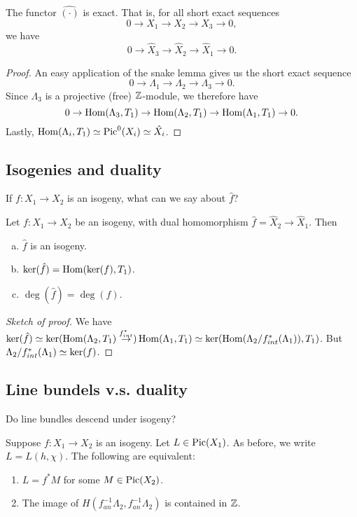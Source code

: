 \begin{lemma}
The functor $\hat{(\cdot)}$ is exact. That is, for all short exact sequences 
$$0\to X_1 \to X_2 \to X_3 \to 0,$$
we have 
$$0\to \hat{X}_3\to \hat{X}_2 \to \hat{X}_1\to 0.$$

\end{lemma} 

\begin{proof}
An easy application of the snake lemma gives us the short exact sequence
$$0\to \Lambda_1\to \Lambda_2\to \Lambda_3\to 0.$$
Since $\Lambda_3$ is a projective (free) ${\mathbb Z}$-module, we therefore have 
$$0\to \operatorname{Hom}(\Lambda_3,T_1)\to \operatorname{Hom}(\Lambda_2,T_1)\to \operatorname{Hom}(\Lambda_1,T_1)\to 0.$$
Lastly, $\operatorname{Hom}(\Lambda_i,T_1)\simeq \operatorname{Pic}^0(X_i)\simeq \hat{X_i}$.
\end{proof}


\subsection{Isogenies and duality}

If $f:X_1\to X_2$ is an isogeny, what can we say about $\hat{f}$?

\begin{proposition}
Let $f:X_1\to X_2$ be an isogeny, with dual homomorphism $\hat{f}=\hat{X}_2\to \hat{X}_1$. Then 
\begin{enumerate}[(a)]
\item $\hat{f}$ is an isogeny.
\item $\ker(\hat{f})=\operatorname{Hom}(\ker(f),T_1)$.
\item $\deg(\hat{f})=\deg(f)$.
\end{enumerate}
\end{proposition}

\begin{proof}[Sketch of proof]
We have $\ker(\hat{f})\simeq \ker(\operatorname{Hom}(\Lambda_2,T_1)\overset{f_{int}^*}{\to}) \operatorname{Hom}(\Lambda_1,T_1)\simeq \ker(\operatorname{Hom}(\Lambda_2/ f_{int}^*(\Lambda_1)),T_1)$. But $\Lambda_2/f_{int}^*(\Lambda_1)\simeq \ker(f)$.
\end{proof}

\subsection{Line bundels v.s. duality}

Do line bundles descend under isogeny? 

\begin{proposition}
Suppose $f:X_1\to X_2$ is an isogeny. Let $L\in \operatorname{Pic}(X_1)$. As before, we write $L=L(h,\chi)$. The following are equivalent:
\begin{enumerate}
\item $L=f^* M$ for some $M\in \operatorname{Pic}(X_2)$.
\item The image of $H(f_{an}^{-1}\Lambda_2, f_{an}^{-1} \Lambda_2)$ is contained in ${\mathbb Z}$.
\end{enumerate}
\end{proposition}

